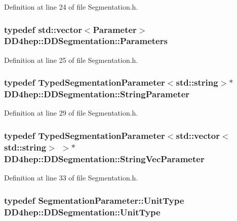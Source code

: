 Definition at line 24 of file Segmentation.h.\hypertarget{namespace_d_d4hep_1_1_d_d_segmentation_af38026430ca0e1ef64acdfc898f5dd3d}{
\subsubsection[{Parameters}]{\setlength{\rightskip}{0pt plus 5cm}typedef std::vector$<${\bf Parameter}$>$ {\bf DD4hep::DDSegmentation::Parameters}}}
\label{namespace_d_d4hep_1_1_d_d_segmentation_af38026430ca0e1ef64acdfc898f5dd3d}


Definition at line 25 of file Segmentation.h.\hypertarget{namespace_d_d4hep_1_1_d_d_segmentation_a43a80cf70a60b3c858aca4fa463d8f7c}{
\subsubsection[{StringParameter}]{\setlength{\rightskip}{0pt plus 5cm}typedef {\bf TypedSegmentationParameter}$<$std::string$>$$\ast$ {\bf DD4hep::DDSegmentation::StringParameter}}}
\label{namespace_d_d4hep_1_1_d_d_segmentation_a43a80cf70a60b3c858aca4fa463d8f7c}


Definition at line 29 of file Segmentation.h.\hypertarget{namespace_d_d4hep_1_1_d_d_segmentation_a6560c8ed740be64475f81e890aaa58b2}{
\subsubsection[{StringVecParameter}]{\setlength{\rightskip}{0pt plus 5cm}typedef {\bf TypedSegmentationParameter}$<$std::vector$<$std::string$>$ $>$$\ast$ {\bf DD4hep::DDSegmentation::StringVecParameter}}}
\label{namespace_d_d4hep_1_1_d_d_segmentation_a6560c8ed740be64475f81e890aaa58b2}


Definition at line 33 of file Segmentation.h.\hypertarget{namespace_d_d4hep_1_1_d_d_segmentation_a416c3e3ca0d578410085897700ab29dc}{
\subsubsection[{UnitType}]{\setlength{\rightskip}{0pt plus 5cm}typedef {\bf SegmentationParameter::UnitType} {\bf DD4hep::DDSegmentation::UnitType}}}
\label{namespace_d_d4hep_1_1_d_d_segmentation_a416c3e3ca0d578410085897700ab29dc}


